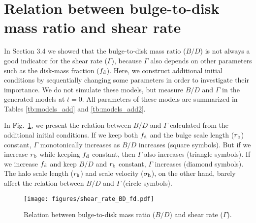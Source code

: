 \section[]{Relation between bulge-to-disk mass ratio and shear rate}

In Section 3.4 we showed that the bulge-to-disk mass ratio ($B/D$) is not 
always a good indicator for the shear rate ($\Gamma$), because $\Gamma$ 
also depends on other parameters such as the disk-mass fraction ($f_{\rm d}$). 
Here, we construct additional initial conditions by sequentially changing some 
parameters in order to investigate their importance. We do not simulate 
these models, but measure $B/D$ and $\Gamma$ in the generated models at $t=0$.
All parameters of these models are summarized in Tables \ref{tb:models_add} and 
 \ref{tb:models_add2}.

In Fig.~\ref{fig:Gamma_BD}, we present the relation between $B/D$ and $\Gamma$
calculated from the additional initial conditions.
If we keep both $f_{\rm d}$ and the bulge scale length ($r_{\rm b}$) constant,
$\Gamma$ monotonically increases as $B/D$ increases (square symbols).
But if we increase $r_{\rm b}$ while keeping $f_{\rm d}$ constant, then $\Gamma$ 
also increases (triangle symbols). 
If we increase $f_{\rm d}$ and keep $B/D$ and $r_{\rm b}$ constant,
$\Gamma$ increases (diamond symbols). 
The halo scale length ($r_{\rm h}$) and scale velocity 
($\sigma_{\rm h}$), on the other hand, barely affect the relation between $B/D$ and $\Gamma$
(circle symbols).


\begin{figure}
\texttt{[image: figures/shear\_rate\_BD\_fd.pdf]}
\caption{Relation between bulge-to-disk mass ratio ($B/D$) and shear rate ($\Gamma$). \label{fig:Gamma_BD}}
\end{figure}


